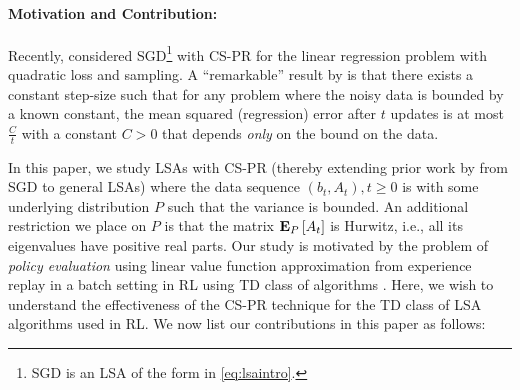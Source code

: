\paragraph{Motivation and Contribution:} Recently, \citet{bach} considered SGD\footnote{SGD is an LSA of the form in \eqref{eq:lsaintro}.} with CS-PR for the linear regression problem with quadratic loss and \iid sampling. A ``remarkable'' result by \citet{bach} is that there exists a constant step-size such that for any problem where the noisy data is bounded by a known constant, the mean squared (regression) error after $t$ updates is at most $\frac{C}{t}$ with a constant $C>0$ that depends \emph{only} on the bound on the data.\par{}
In this paper, we study LSAs with CS-PR (thereby extending prior work by \citet{bach} from SGD to general LSAs) where the data sequence $(b_t,A_t),t\geq 0$ is \iid with some underlying distribution $P$ such that the variance is bounded. An additional restriction we place on $P$ is that the matrix $\mathbf{E}_P\left[A_t\right]$ is Hurwitz, i.e., all its eigenvalues have positive real parts.
Our study is motivated by the problem of \emph{policy evaluation} \cite{dann} using linear value function approximation from experience replay \cite{lin} in a batch setting \cite{lange} in RL using TD class  of algorithms \cite{sutton,konda-tsitsiklis,gtd,gtd2,gtdmp}. Here, we wish to understand the effectiveness of the CS-PR technique for the TD class of LSA algorithms used in RL.
We now list our contributions in this paper as follows:
